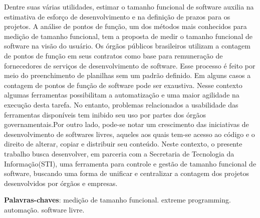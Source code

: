 \begin{resumo}
  Dentre suas várias utilidades, estimar o tamanho funcional de software auxilia na estimativa de esforço de desenvolvimento e na definição de prazos para os projetos. A análise de pontos de função, um dos métodos mais conhecidos para medição de tamanho funcional, tem a proposta de medir o tamanho funcional de software na visão do usuário. Os órgãos públicos brasileiros utilizam a contagem de pontos de função em seus contratos como base para remuneração de fornecedores de serviços de desenvolvimento de software. Esse processo é feito por meio do preenchimento de planilhas sem um padrão definido. Em alguns casos a contagem de pontos de função de software pode ser exaustiva. Nesse contexto algumas ferramentas possibilitam a automatização e uma maior agilidade na execução desta tarefa. No entanto, problemas relacionados a usabilidade das ferramentas disponíveis tem inibido seu uso por partes dos órgãos governamentais.Por outro lado, pode-se notar um crescimento das iniciativas de desenvolvimento de softwares livres, aqueles aos quais tem-se acesso ao código e o direito de alterar, copiar e distribuir seu conteúdo.  Neste contexto, o presente trabalho busca desenvolver, em parceria com a Secretaria de Tecnologia da Informação(STI), uma ferramenta para controle e gestão de tamanho funcional de software, buscando uma forma de unificar e centralizar a contagem dos projetos desenvolvidos por órgãos e empresas.

 \vspace{\onelineskip}

 \noindent
 \textbf{Palavras-chaves}: medição de tamanho funcional. extreme programming. automação. software livre.
\end{resumo}
